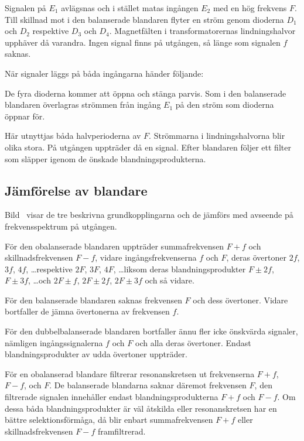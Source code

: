 Signalen på \(E_1\) avlägsnas och i stället matas ingången \(E_2\) med
en hög frekvens \(F\).
Till skillnad mot i den balanserade blandaren flyter en ström genom dioderna
\(D_1\) och \(D_2\) respektive \(D_3\) och \(D_4\).
Magnetfälten i transformatorernas lindningshalvor upphäver då varandra.
Ingen signal finns på utgången, så länge som signalen \(f\) saknas.

När signaler läggs på båda ingångarna händer följande:

De fyra dioderna kommer att öppna och stänga parvis.
Som i den balanserade blandaren överlagras strömmen från ingång \(E_1\) på den
ström som dioderna öppnar för.

Här utnyttjas båda halvperioderna av \(F\).
Strömmarna i lindningshalvorna blir olika stora.
På utgången uppträder då en signal.
Efter blandaren följer ett filter som släpper igenom de önskade
blandningsprodukterna.

\clearpage
\subsection{Jämförelse av blandare}


Bild~ visar de tre beskrivna grundkopplingarna och de
jämförs med avseende på frekvensspektrum på utgången.

För den obalanserade blandaren uppträder summafrekvensen \(F + f\) och
skillnadsfrekvensen \(F - f\), vidare ingångsfrekvenserna \(f\) och \(F\),
deras övertoner \(2f\), \(3f\), \(4f\), \ldots respektive  \(2F\), \(3F\),
\(4F\), \ldots liksom deras blandningsprodukter \(F\pm 2f\), \(F\pm
3f\), \ldots och \(2F \pm f\), \(2F \pm 2f\), \(2F \pm 3f\) och så vidare.

För den balanserade blandaren saknas frekvensen \(F\) och dess övertoner.
Vidare bortfaller de jämna övertonerna av frekvensen \(f\).

För den dubbelbalanserade blandaren bortfaller ännu fler icke önskvärda
signaler, nämligen ingångssignalerna \(f\) och \(F\) och alla deras övertoner.
Endast blandningsprodukter av udda övertoner uppträder.

För en obalanserad blandare filtrerar resonanskretsen ut frekvenserna
\(F + f\), \(F - f\), och \(F\).
De balanserade blandarna saknar däremot frekvensen \(F\), den filtrerade
signalen innehåller endast blandningsprodukterna \(F + f\) och \(F - f\).
Om dessa båda blandningsprodukter är väl åtskilda eller resonanskretsen har en
bättre selektionsförmåga, då blir enbart summafrekvensen \(F + f\)
eller skillnadsfrekvensen \(F - f\) framfiltrerad.

